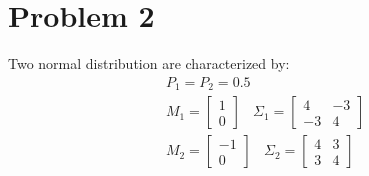 \documentclass[12pt]{article}
\begin{document}
\section{Problem 2}
Two normal distribution are characterized by: 
\begin{align*}
&P_1 = P_2 = 0.5 \\
&M_1 = \left[ \begin{matrix}
1 \\ 
0 
\end{matrix} 
\right] \> \> \> \>
\Sigma_1 = \left[
\begin{matrix}
4 & -3 \\
-3 & 4
\end{matrix}
\right] \\
&M_2 = \left[ \begin{matrix}
-1 \\ 
0 
\end{matrix} 
\right] \> \> \> \>
\Sigma_2 = \left[
\begin{matrix}
4 & 3 \\
3 & 4
\end{matrix}
\right]
\end{align*}
\end{document}
